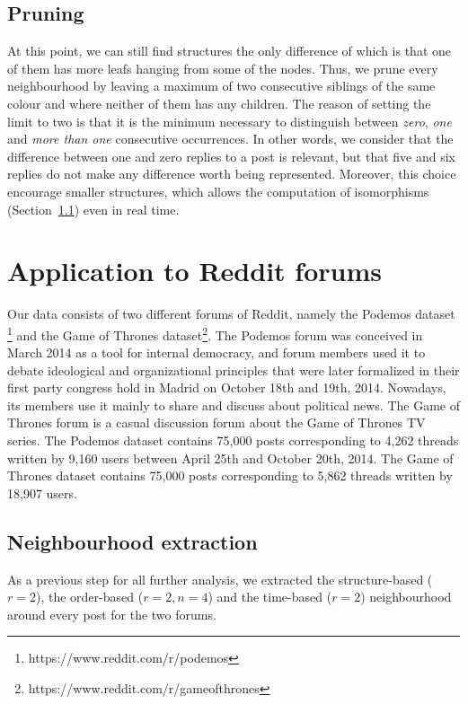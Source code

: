 \documentclass[conference]{IEEEtran}
\begin{document}
\subsection{Pruning}
At this point, we can still find structures the only difference of which is that one of them has more leafs hanging from some of the nodes. Thus, we prune every neighbourhood by leaving a maximum of two consecutive siblings of the same colour and where neither of them has any children. The reason of setting the limit to two is that it is the minimum necessary to distinguish between \textit{zero}, \textit{one} and \textit{more than one} consecutive occurrences. In other words, we consider that the difference between one and zero replies to a post is relevant, but that five and six replies do not make any difference worth being represented.  Moreover, this choice encourage smaller structures, which allows the computation of isomorphisms (Section~\ref{sec:extraction}) even in real time.  

\section{Application to Reddit forums}


Our data consists of two different forums of Reddit, namely the Podemos dataset \footnote{https://www.reddit.com/r/podemos} and the Game of Thrones dataset\footnote{https://www.reddit.com/r/gameofthrones}. The Podemos forum was conceived in March 2014 as a tool for internal democracy, and forum members used it to debate ideological and organizational principles that were later formalized in their first party congress hold in Madrid on October 18th and 19th, 2014. Nowadays, its members use it mainly to share and discuss about political news. The Game of Thrones forum is a casual discussion forum about the Game of Thrones TV series.
The Podemos dataset contains 75,000 posts corresponding to 4,262 threads written by 9,160 users between April 25th and October 20th, 2014. The Game of Thrones dataset contains 75,000 posts corresponding to 5,862 threads written by 18,907 users.

\subsection{Neighbourhood extraction}\label{sec:extraction}
As a previous step for all further analysis, we extracted the structure-based ($r=2$), the order-based ($r=2, n=4$) and the time-based ($r=2$) neighbourhood around every post for the two forums. 
\end{document}
